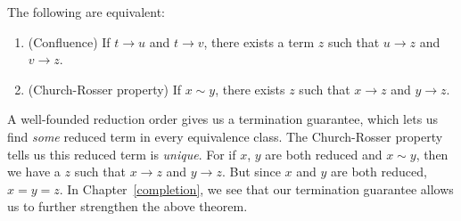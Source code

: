 \documentclass[../generics]{subfiles}
\begin{document}
\begin{theorem}\label{church rosser theorem}
The following are equivalent:
\begin{enumerate}
\item {}(Confluence) If $t\rightarrow u$ and $t\rightarrow v$, there exists a term $z$ such that $u\rightarrow z$ and $v\rightarrow z$.
\item {}(Church-Rosser property) If $x\sim y$, there exists $z$ such that $x\rightarrow z$ and $y\rightarrow z$.
\end{enumerate}
\end{theorem}
A well-founded reduction order gives us a termination guarantee, which lets us find \emph{some} reduced term in every equivalence class. The Church-Rosser property tells us this reduced term is \emph{unique}. For if $x$, $y$ are both reduced and $x\sim y$, then we have a $z$ such that $x\rightarrow z$ and $y\rightarrow z$. But since $x$ and $y$ are both reduced, $x=y=z$. In Chapter~\ref{completion}, we see that our termination guarantee allows us to further strengthen the above theorem.
\end{document}
